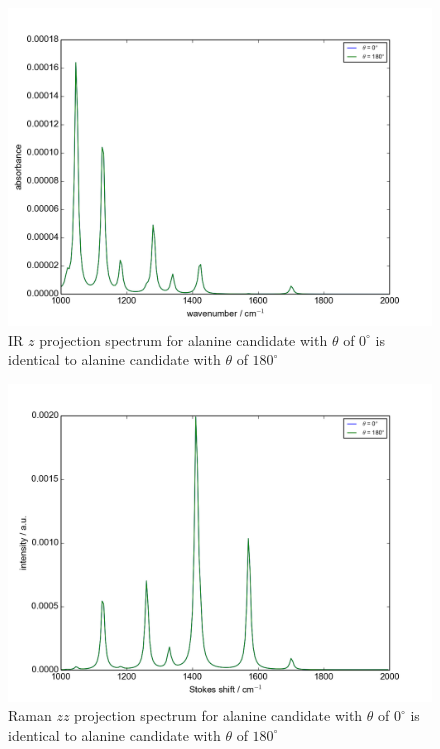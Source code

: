 \begin{figure}[!ht] 
\centering
\includegraphics[scale=0.7]{Figures/Ala_candidates_plotting_ir_z_2.png}
\caption{IR $z$ projection spectrum for alanine candidate with $\theta$ of $0^{\circ}$ is identical to alanine candidate with $\theta$ of $180^{\circ}$} \label{fig:A.1}
\end{figure}

\begin{figure}[!ht] 
\centering
\includegraphics[scale=0.7]{Figures/Ala_candidates_plotting_raman_zz_2.png}
\caption{Raman $zz$ projection spectrum for alanine candidate with $\theta$ of $0^{\circ}$ is identical to alanine candidate with $\theta$ of $180^{\circ}$} \label{fig:A.2}
\end{figure}

